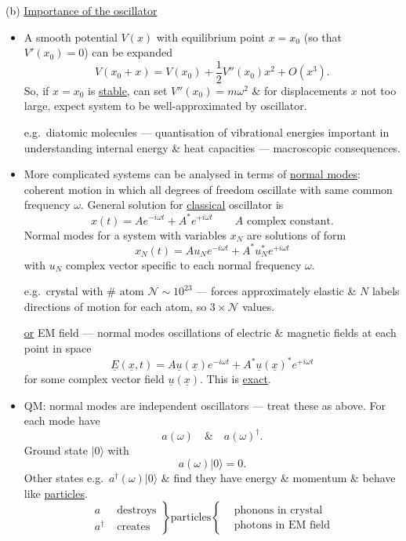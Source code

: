 \documentclass[11pt,a4paper]{article}
\begin{document}
\medskip

\noindent
(b) \underline{Importance of the oscillator}

\begin{itemize}
    \item A smooth potential $V(x)$ with equilibrium point $x=x_0$
    (so that $V'(x_0)=0$) can be expanded
    \[
        V(x_0+x)=V(x_0)+\frac{1}{2}V''(x_0)x^2+O(x^3).
    \]
    So, if $x=x_0$ is \underline{stable}, can set $V''(x_0)=m\omega^2$
    \& for displacements $x$ not too large, expect system to be
    well-approximated by oscillator.

    e.g.\ diatomic molecules --- quantisation of vibrational energies important
    in understanding internal energy \& heat capacities --- macroscopic consequences.

    \item More complicated systems can be analysed in terms of
    \underline{normal modes}: coherent motion in which all degrees of freedom
    oscillate with same common frequency $\omega$.
    General solution for \underline{classical} oscillator is
    \[
        x(t)=Ae^{-i\omega t}+A^*e^{+i\omega t}
        \qquad A\text{ complex constant.}
    \]
    Normal modes for a system with variables $x_N$ are solutions of form
    \[
        x_N(t)=Au_Ne^{-i\omega t}+A^*u_N^*e^{+i\omega t}
    \]
    with $u_N$ complex vector specific to each normal frequency $\omega$.

    e.g.\ crystal with $\#\text{ atom }\mathcal{N}\sim10^{23}$ --- forces
    approximately elastic \& $N$ labels directions of motion for each atom,
    so $3\times\mathcal{N}$ values.

    \underline{or} EM field --- normal modes oscillations of electric \& magnetic
    fields at each point in space
    \[
        \underline{E}(\underline{x},t)
        =A\underline{u}(\underline{x})e^{-i\omega t}
        +A^*\underline{u}(\underline{x})^*e^{+i\omega t}
    \]
    for some complex vector field $\underline{u}(\underline{x})$.
    This is \underline{exact}.

    \item QM: normal modes are independent oscillators --- treat these as above.
    For each mode have
    \[
        a(\omega)\quad\&\quad a(\omega)^\dagger.
    \]
    Ground state $|0\rangle$ with
    \[
        a(\omega)|0\rangle=0.
    \]
    Other states e.g.\ $a^\dagger(\omega)|0\rangle$ \& find they have energy
    \& momentum \& behave like \underline{particles}.
    \[
        \left.
        \begin{aligned}
            a&\text{ destroys}\\
            a^\dagger&\text{ creates}
        \end{aligned}
        \right\}
        \text{particles}
        \left\{
        \begin{aligned}
            &\text{phonons in crystal}\\
            &\text{photons in EM field}
        \end{aligned}
        \right.
    \]
\end{itemize}
\end{document}
